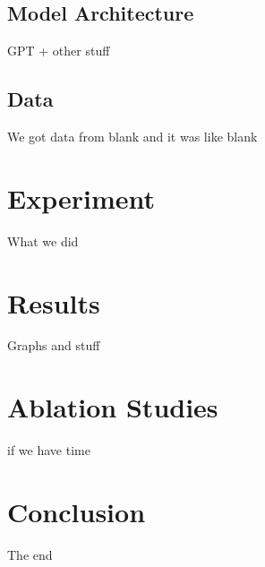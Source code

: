 \documentclass[10pt]{article}
\begin{document}
\subsection{Model Architecture}
GPT + other stuff

\subsection{Data}

We got data from blank and it was like blank

%
% 

\section{Experiment}

What we did

%
% 
\section{Results}

Graphs and stuff

%
% 
\section{Ablation Studies}
if we have time

%
% 
\section{Conclusion}
The end


\end{document}
